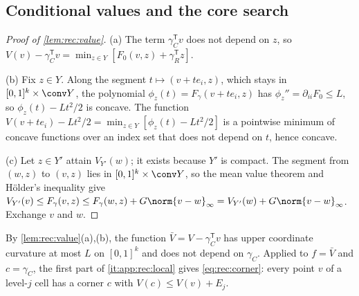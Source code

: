 \subsection{Conditional values and the core search}\label{app:rec:search}

\begin{proof}[Proof of \cref{lem:rec:value}]
(a) The term $\gamma_C^{\mathsf T}v$ does not depend on $z$, so
$V(v)-\gamma_C^{\mathsf T}v=\min_{z\in Y}[F_0(v,z)+\gamma_R^{\mathsf T}z]$.

(b) Fix $z\in Y$. Along the segment $t\mapsto(v+te_i,z)$, which stays in
$[0,1]^k\times\conv Y$, the polynomial $\phi_z(t)=F_\gamma(v+te_i,z)$ has
$\phi_z''=\partial_{ii}F_0\le L$, so $\phi_z(t)-Lt^2/2$ is concave. The
function $V(v+te_i)-Lt^2/2=\min_{z\in Y}[\phi_z(t)-Lt^2/2]$ is a pointwise
minimum of concave functions over an index set that does not depend on $t$,
hence concave.

(c) Let $z\in Y'$ attain $V_{Y'}(w)$; it exists because $Y'$ is compact. The
segment from $(w,z)$ to $(v,z)$ lies in $[0,1]^k\times\conv Y$, so the mean
value theorem and H\"older's inequality give
$V_{Y'}(v)\le F_\gamma(v,z)\le F_\gamma(w,z)+G\norm{v-w}_\infty
=V_{Y'}(w)+G\norm{v-w}_\infty$. Exchange $v$ and $w$.
\end{proof}

By \cref{lem:rec:value}(a),(b), the function $\bar V=V-\gamma_C^{\mathsf T}v$
has upper coordinate curvature at most $L$ on $[0,1]^k$ and does not depend
on $\gamma_C$. Applied to $f=\bar V$ and $c=\gamma_C$, the first part of
\ref{it:app:rec:local} gives \eqref{eq:rec:corner}: every point $v$ of a
level-$j$ cell has a corner $c$ with $V(c)\le V(v)+E_j$.

